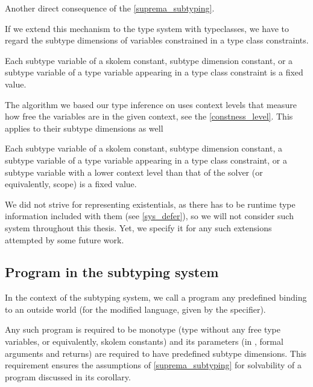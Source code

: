 \begin{remark}
    Another direct consequence of the \cref{suprema_subtyping}.
\end{remark}

If we extend this mechanism to the type system with typeclasses, we have to regard the subtype dimensions of variables constrained in a type class constraints.

\begin{defn}
    Each subtype variable of a skolem constant, subtype dimension constant, or a subtype variable of a type variable appearing in a type class constraint is a fixed value.
\end{defn}


The algorithm we based our type inference on uses context levels that measure how free the variables are in the given context, see the \cref{constness_level}. This applies to their subtype dimensions as well

\begin{defn}
    Each subtype variable of a skolem constant, subtype dimension constant, a subtype variable of a type variable appearing in a type class constraint, or a subtype variable with a lower context level than that of the solver (or equivalently, scope) is a fixed value.
\end{defn}

We did not strive for representing existentials, as there has to be runtime type information included with them (see \cref{sys_defer}), so we will not consider such system throughout this thesis. Yet, we specify it for any such extensions attempted by some future work.

\subsection{Program in the subtyping system}

In the context of the subtyping system, we call a program any predefined binding to an outside world (for the modified \cmm language, given by the  specifier).

Any such program is required to be monotype (type without any free type variables, or equivalently, skolem constants) and its parameters (in \cmm, formal arguments and returns) are required to have predefined subtype dimensions. This requirement ensures the assumptions of \cref{suprema_subtyping} for solvability of a program discussed in its corollary.

